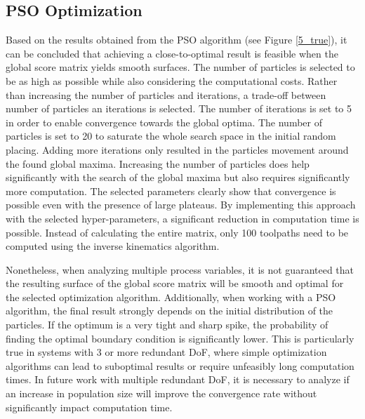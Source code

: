 \subsection{PSO Optimization}
Based on the results obtained from the \acrshort{PSO} algorithm (see Figure \ref{5_true}), it can be concluded that achieving a close-to-optimal result is feasible when the global score matrix yields smooth surfaces. The number of particles is selected to be as high as possible while also considering the computational costs. Rather than increasing the number of particles and iterations, a trade-off between number of particles an iterations is selected. The number of iterations is set to 5 in order to enable convergence towards the global optima. The number of particles is set to 20 to saturate the whole search space in the initial random placing. Adding more iterations only resulted in the particles movement around the found global maxima. Increasing the number of particles does help significantly with the search of the global maxima but also requires significantly more computation. The selected parameters clearly show that convergence is possible even with the presence of large plateaus.
By implementing this approach with the selected hyper-parameters, a significant reduction in computation time is possible. Instead of calculating the entire matrix, only 100 toolpaths need to be computed using the inverse kinematics algorithm.  


Nonetheless, when analyzing multiple process variables, it is not guaranteed that the resulting surface of the global score matrix will be smooth and optimal for the selected optimization algorithm. Additionally, when working with a \acrshort{PSO} algorithm, the final result strongly depends on the initial distribution of the particles. If the optimum is a very tight and sharp spike, the probability of finding the optimal boundary condition is significantly lower. This is particularly true in systems with 3 or more redundant \acrshort{DoF}, where simple optimization algorithms can lead to suboptimal results or require unfeasibly long computation times. In future work with multiple redundant \acrshort{DoF}, it is necessary to analyze if an increase in population size will improve the convergence rate without significantly impact computation time. 



